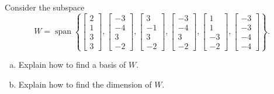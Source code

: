 
\begin{exerciseStatement}


Consider the subspace \[W=\operatorname{span}  \left\{ \left[\begin{array}{c}
2 \\
1 \\
3 \\
3
\end{array}\right] , \left[\begin{array}{c}
-3 \\
-4 \\
3 \\
-2
\end{array}\right] , \left[\begin{array}{c}
3 \\
-1 \\
3 \\
-2
\end{array}\right] , \left[\begin{array}{c}
-3 \\
-4 \\
3 \\
-2
\end{array}\right] , \left[\begin{array}{c}
1 \\
1 \\
-3 \\
-2
\end{array}\right] , \left[\begin{array}{c}
-3 \\
-3 \\
-4 \\
-4
\end{array}\right] \right\} .\]


\begin{enumerate}[(a)]
\item  Explain how to find a basis of \(W\).
\item  Explain how to find the dimension of \(W\).
\end{enumerate}
    
\end{exerciseStatement}
    
